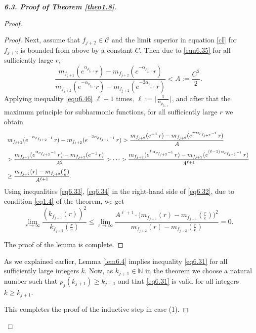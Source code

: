 \documentclass[11pt, oneside]{amsart}
\begin{document}
\begin{proof}[{\bf 6.3. Proof of Theorem \ref{theo1.8}}]
\begin{proof}
\begin{proof}
Next, assume that $f_{j+2}\in \mathscr C$ and the limit superior in equation \eqref{cI} for $f_{j+2}$ is bounded from above by a constant $C$. Then due to \eqref{equ6.35} for all sufficiently large $r$,
\begin{equation}\label{equ6.46}
\frac{m_{f_{j+2}}
(e^{\alpha_{\rho_{f_{j+2}}}}r)-m_{f_{j+2}}(e^{-\alpha_{\rho_{f_{j+2}}}}r)}{m_{f_{j+2}}(e^{-\alpha_{\rho_{f_{j+2}}}}r)-m_{f_{j+2}}(e^{-2\alpha_{\rho_{f_{j+2}}}}r)}<A:=\frac{C^2}{2}.
\end{equation}
Applying inequality \eqref{equ6.46} $\ell+1$ times, $\ell:=\bigl\lceil \frac{1}{\alpha_{\rho_{f_{j+2}}}}\bigr\rceil$,  and after that the maximum  principle for subharmonic functions,  for all sufficiently large $r$ we obtain\smallskip
\begin{equation}\label{eq6.34}
\begin{array}{l}
\displaystyle
m_{f_{j+2}}(e^{-\alpha_{\rho_{f_{j+2}}-1}}\, r)-m_{f_{j+2}}(e^{-2\alpha_{\rho_{f_{j+2}}-1}}\, r)>\frac{m_{f_{j+2}}(e^{-1}\, r)-m_{f_{j+2}}(e^{-\alpha_{\rho_{f_{j+2}}-1}}\, r)}{A}\medskip\\
\displaystyle >\frac{m_{f_{j+2}}(e^{\alpha_{\rho_{f_{j+2}}-1}}\, r)-m_{f_{j+2}}(e^{-1}\, r)}{A^2}>\cdots >\frac{m_{f_{j+2}}(e^{\ell\, \alpha_{\rho_{f_{j+2}}-1}}\, r)-m_{f_{j+2}}(e^{(\ell-1)\, \alpha_{\rho_{f_{j+2}}-1}}\, r)}{A^{\ell+1}}\medskip\\
\displaystyle\ge \frac{m_{f_{j+2}}( r)-m_{f_{j+2}}(\frac re)}{A^{\ell+1}}.
\end{array}
\end{equation}
Using inequalities \eqref{eq6.33}, \eqref{eq6.34} in the right-hand side of \eqref{eq6.32}, due to condition \eqref{eq1.4} of the theorem, we get
\[
\lim_{r\rightarrow\infty}\frac{(k_{f_{j+1}}(r))^2}{k_{f_{j+2}}\left(\frac re\right)}\le
\lim_{r\rightarrow\infty}\frac{A^{\ell+1}\cdot\bigl(m_{f_{j+1}}(r)-m_{f_{j+1}}\left(\frac re\right)
 \bigr)^{2}}{m_{f_{j+2}}( r)-m_{f_{j+2}}(\frac re)}=0.
\]

The proof of the lemma is complete.
\end{proof}

As we explained earlier, Lemma \ref{lem6.4} implies inequality \eqref{eq6.31} for all sufficiently large integers $k$. Now, as $k_{j+1}\in\mathbb N$ in the theorem we choose a natural number such that $p_j(k_{j+1})\ge \tilde k_{j+1}$ and that \eqref{eq6.31} is valid for all integers $k\ge k_{j+1}$. 

This completes the proof of the inductive step in case (1).\smallskip


\end{proof}
\end{proof}
\end{document}
